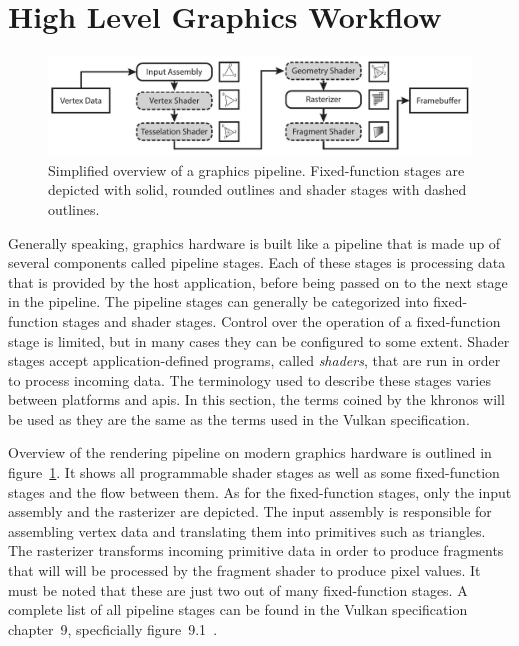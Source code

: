   \section{High Level Graphics Workflow}
  \label{sec:GraphicsWorkflow}
    \begin{figure}
      \includegraphics[width=\textwidth]{Main/Images/Rendering_Pipeline_Overview}
      \centering
      \caption{Simplified overview of a graphics pipeline. Fixed-function stages are depicted with solid, rounded outlines and shader stages with dashed outlines.}
      \label{fig:Rendering_Pipeline_Overview}
    \end{figure}

    Generally speaking, graphics hardware is built like a pipeline that is made up of several components called pipeline stages.
    Each of these stages is processing data that is provided by the host application, before being passed on to the next stage in the pipeline.
    The pipeline stages can generally be categorized into fixed-function stages and shader stages.
    Control over the operation of a fixed-function stage is limited, but in many cases they can be configured to some extent.
    Shader stages accept application-defined programs, called \textit{shaders}, that are run in order to process incoming data.
    The terminology used to describe these stages varies between platforms and \glspl{api}.
    In this section, the terms coined by the \gls{khronos} will be used as they are the same as the terms used in the Vulkan specification.

    Overview of the rendering pipeline on modern graphics hardware is outlined in figure~\ref{fig:Rendering_Pipeline_Overview}.
    It shows all programmable shader stages as well as some fixed-function stages and the flow between them.
    As for the fixed-function stages, only the input assembly and the rasterizer are depicted.
    The input assembly is responsible for assembling vertex data and translating them into primitives such as triangles.
    The rasterizer transforms incoming primitive data in order to produce fragments that will will be processed by the fragment shader to produce pixel values.
    It must be noted that these are just two out of many fixed-function stages.
    A complete list of all pipeline stages can be found in the Vulkan specification chapter~9, specficially figure~9.1~\cite{vkspec}.

